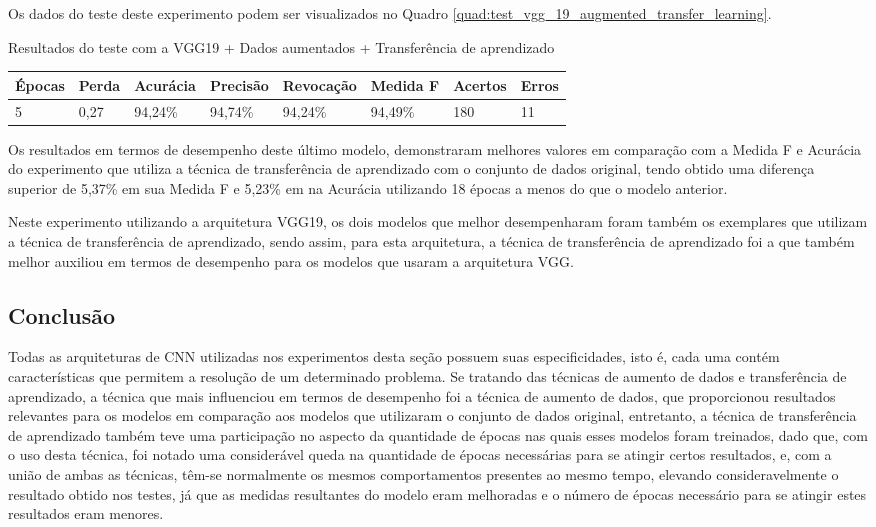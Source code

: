 \documentclass[
	12pt,				%
	oneside,			%
	a4paper,			%
	english,			%
	brazil				%
	]{abntex2ppgsi}
\begin{document}
Os dados do teste deste experimento podem ser visualizados no Quadro \ref{quad:test_vgg_19_augmented_transfer_learning}.

\begin{quadro}[H]
\caption{Resultados do teste com a VGG19 + Dados aumentados + Transferência de aprendizado}
\label{quad:test_vgg_19_augmented_transfer_learning}
\centering
\begin{tabular}{|l|l|l|l|l|l|l|l|}
\cline{1-8}
Épocas & Perda & Acurácia & Precisão & Revocação & Medida F & Acertos & Erros \\ \hline
5 & 0,27 & 94,24\% & 94,74\% & 94,24\% & 94,49\% & 180 & 11 \\
\cline{1-8}
\end{tabular}
\end{quadro}

Os resultados em termos de desempenho deste último modelo, demonstraram melhores valores em comparação com a Medida F e Acurácia do experimento que utiliza a técnica de transferência de aprendizado com o conjunto de dados original, tendo obtido uma diferença superior de 5,37\% em sua Medida F e 5,23\% em na Acurácia utilizando 18 épocas a menos do que o modelo anterior.

Neste experimento utilizando a arquitetura VGG19, os dois modelos que melhor desempenharam foram também os exemplares que utilizam a técnica de transferência de aprendizado, sendo assim, para esta arquitetura, a técnica de transferência de aprendizado foi a que também melhor auxiliou em termos de desempenho para os modelos que usaram a arquitetura VGG.

\subsection{Conclusão}
Todas as arquiteturas de CNN utilizadas nos experimentos desta seção possuem suas especificidades, isto é, cada uma contém características que permitem a resolução de um determinado problema. Se tratando das técnicas de aumento de dados e transferência de aprendizado, a técnica que mais influenciou em termos de desempenho foi a técnica de aumento de dados, que proporcionou resultados relevantes para os modelos em comparação aos modelos que utilizaram o conjunto de dados original, entretanto, a técnica de transferência de aprendizado também teve uma participação no aspecto da quantidade de épocas nas quais esses modelos foram treinados, dado que, com o uso desta técnica, foi notado uma considerável queda na quantidade de épocas necessárias para se atingir certos resultados, e, com a união de ambas as técnicas, têm-se normalmente os mesmos comportamentos presentes ao mesmo tempo, elevando consideravelmente o resultado obtido nos testes, já que as medidas resultantes do modelo eram melhoradas e o número de épocas necessário para se atingir estes resultados eram menores. 
\end{document}
